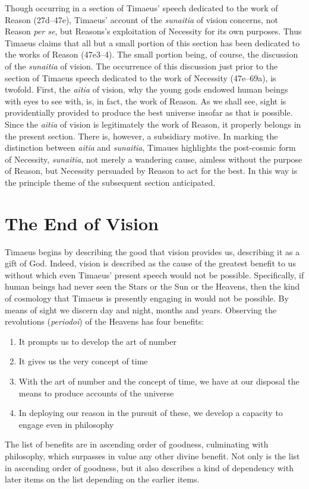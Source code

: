 Though occurring in a section of Timaeus' speech dedicated to the work of Reason (27d--47e), Timaeus' account of the \emph{sunaitia} of vision concerns, not Reason \emph{per se}, but Reasons's exploitation of Necessity for its own purposes. Thus Timaeus claims that all but a small portion of this section has been dedicated to the works of Reason (47e3--4). The small portion being, of course, the discussion of the \emph{sunaitia} of vision. The occurrence of this discussion just prior to the section of Timaeus speech dedicated to the work of Necessity (47e--69a), is twofold. First, the \emph{aitia} of vision, why the young gods endowed human beings with eyes to see with, is, in fact, the work of Reason. As we shall see, sight is providentially provided to produce the best universe insofar as that is possible. Since the \emph{aitia} of vision is legitimately the work of Reason, it properly belongs in the present section. There is, however, a subsidiary motive. In marking the distinction between \emph{aitia} and \emph{sunaitia}, Timaues highlights the post-cosmic form of Necessity, \emph{sunaitia}, not merely a wandering cause, aimless without the purpose of Reason, but Necessity persuaded by Reason to act for the best. In this way is the principle theme of the subsequent section anticipated.


\section{The End of Vision} %
\label{sec:the_end_of_sight}

Timaeus begins by describing the good that vision provides us, describing it as a gift of God. Indeed, vision is described as the cause of the greatest benefit to us without which even Timaeus' present speech would not be possible. Specifically, if human beings had never seen the Stars or the Sun or the Heavens, then the kind of cosmology that Timaeus is presently engaging in would not be possible. By means of sight we discern day and night, months and years. Observing the revolutions (\emph{periodoi}) of the Heavens has four benefits:
\begin{enumerate}
	\item It prompts us to develop the art of number
	\item It gives us the very concept of time
	\item With the art of number and the concept of time, we have at our disposal the means to produce accounts of the universe
	\item In deploying our reason in the pursuit of these, we develop a capacity to engage even in philosophy
\end{enumerate}
The list of benefits are in ascending order of goodness, culminating with philosophy, which surpasses in value any other divine benefit. Not only is the list in ascending order of goodness, but it also describes a kind of dependency with later items on the list depending on the earlier items.

